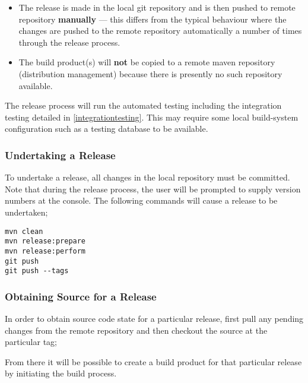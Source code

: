 \begin{itemize}
\item The release is made in the local git repository and is then pushed to remote repository {\bf manually} --- this differs from the typical behaviour where the changes are pushed to the remote repository automatically a number of times through the release process.
\item The build product(s) will {\bf not} be copied to a remote maven repository (distribution management) because there is presently no such repository available.
\end{itemize}

The release process will run the automated testing including the integration testing detailed in \ref{integrationtesting}.  This may require some local build-system configuration such as a testing database to be available.

\subsubsection{Undertaking a Release}

To undertake a release, all changes in the local repository must be committed.  Note that during the release process, the user will be prompted to supply version numbers at the console.  The following commands will cause a release to be undertaken;

\begin{verbatim}
mvn clean
mvn release:prepare
mvn release:perform
git push
git push --tags
\end{verbatim}

\subsubsection{Obtaining Source for a Release}

In order to obtain source code state for a particular release, first pull any pending changes from the remote repository and then checkout the source at the particular tag;


From there it will be possible to create a build product for that particular release by initiating the build process.